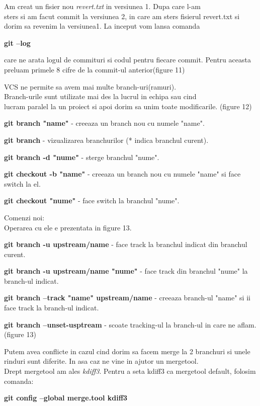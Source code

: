 \documentclass[11pt]{article}
\begin{document}
Am creat un fisier nou \textit{revert.txt} in versiunea 1. Dupa care l-am
\\sters si am facut commit la versiunea 2, in care am sters 
fisierul revert.txt si dorim sa revenim la versiunea1. 
La inceput vom lansa comanda 

\textbf{git –log}

care ne arata logul de commituri si codul pentru fiecare commit. 
Pentru aceasta preluam primele 8 cifre de la commit-ul anterior(figure 11)

VCS ne permite sa avem mai multe branch-uri(ramuri).
\\Branch-urile sunt utilizate mai des la lucrul in echipa sau cind
\\lucram paralel la un proiect si apoi dorim sa unim toate modificarile.
(figure 12)

\textbf{git branch "name"} - creeaza un branch nou cu numele "name".

\textbf{git branch} - vizualizarea branchurilor (* indica branchul curent).

\textbf{git branch -d "nume"} - sterge branchul "nume".

\textbf{git checkout -b "name"} - creeaza un branch nou cu numele "name" si face
switch la el.

\textbf{git checkout "nume"} - face switch la branchul "nume".

Comenzi noi:
\\Operarea cu ele e prezentata in figure 13.

\textbf{git branch -u upstream/name} - face track la branchul indicat din 
branchul curent.

\textbf{git branch -u upstream/name "nume"} - face track din branchul
"nume" la branch-ul indicat.

\textbf{git branch –track "name" upstream/name} - creeaza branch-ul "name"
si ii face track la branch-ul indicat.

\textbf{git branch –unset-usptream} - scoate tracking-ul la branch-ul in 
care ne aflam. 
\\(figure 13)

Putem avea conflicte in cazul cind dorim sa facem merge la 2 branchuri
si unele rinduri sunt diferite. In asa caz ne vine in ajutor un mergetool.
\\Drept mergetool am ales \textit{kdiff3}. Pentru a seta kdiff3 ca mergetool 
default, folosim comanda:

\textbf{git config –global merge.tool kdiff3}
\end{document}
